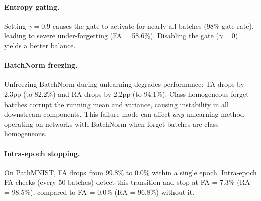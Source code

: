 \documentclass{article}
\begin{document}
\paragraph{Entropy gating.}
Setting $\gamma = 0.9$ causes the gate to activate for nearly all batches (98\% gate rate), leading to severe under-forgetting (FA = 58.6\%).
Disabling the gate ($\gamma = 0$) yields a better balance.

\paragraph{BatchNorm freezing.}
Unfreezing BatchNorm during unlearning degrades performance: TA drops by 2.3pp (to 82.2\%) and RA drops by 2.2pp (to 94.1\%).
Class-homogeneous forget batches corrupt the running mean and variance, causing instability in all downstream components.
This failure mode can affect \emph{any} unlearning method operating on networks with BatchNorm when forget batches are class-homogeneous.

\paragraph{Intra-epoch stopping.}
On PathMNIST, FA drops from 99.8\% to 0.0\% within a single epoch.
Intra-epoch FA checks (every 50 batches) detect this transition and stop at FA = 7.3\% (RA = 98.5\%), compared to FA = 0.0\% (RA = 96.8\%) without it.
\end{document}
